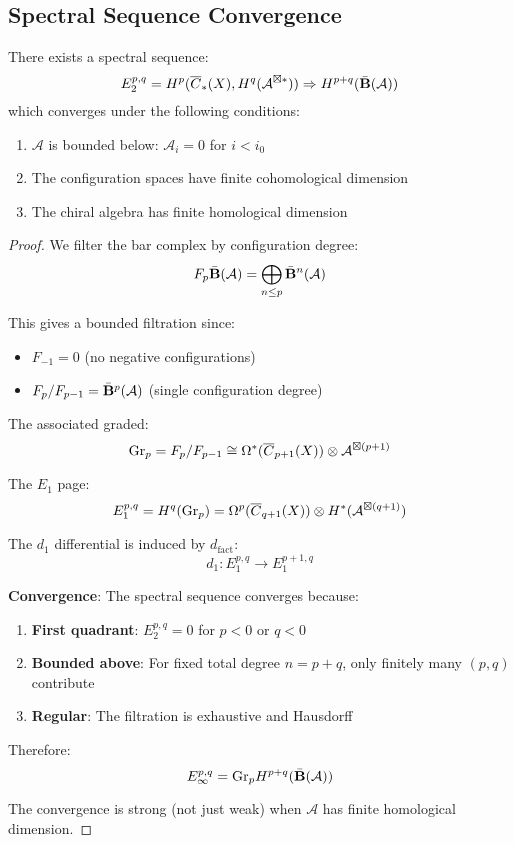 \subsection{Spectral Sequence Convergence}

\begin{theorem}
There exists a spectral sequence:
$$E_2^{p,q} = H^p(\overline{C}_{*}(X), H^q(\mathcal{A}^{\boxtimes *})) \Rightarrow H^{p+q}(\bar{\mathbf{B}}(\mathcal{A}))$$
which converges under the following conditions:
\begin{enumerate}
\item $\mathcal{A}$ is bounded below: $\mathcal{A}_i = 0$ for $i < i_0$
\item The configuration spaces have finite cohomological dimension
\item The chiral algebra has finite homological dimension
\end{enumerate}
\end{theorem}

\begin{proof}
We filter the bar complex by configuration degree:
$$F_p\bar{\mathbf{B}}(\mathcal{A}) = \bigoplus_{n \leq p} \bar{\mathbf{B}}^n(\mathcal{A})$$

This gives a bounded filtration since:
\begin{itemize}
\item $F_{-1} = 0$ (no negative configurations)
\item $F_p/F_{p-1} = \bar{\mathbf{B}}^p(\mathcal{A})$ (single configuration degree)
\end{itemize}

The associated graded:
$$\text{Gr}_p = F_p/F_{p-1} \cong \Omega^*(\overline{C}_{p+1}(X)) \otimes \mathcal{A}^{\boxtimes(p+1)}$$

The $E_1$ page:
$$E_1^{p,q} = H^q(\text{Gr}_p) = \Omega^p(\overline{C}_{q+1}(X)) \otimes H^*(\mathcal{A}^{\boxtimes(q+1)})$$

The $d_1$ differential is induced by $d_{\text{fact}}$:
$$d_1: E_1^{p,q} \to E_1^{p+1,q}$$

\textbf{Convergence}: The spectral sequence converges because:
\begin{enumerate}
\item \textbf{First quadrant}: $E_2^{p,q} = 0$ for $p < 0$ or $q < 0$
\item \textbf{Bounded above}: For fixed total degree $n = p + q$, only finitely many $(p,q)$ contribute
\item \textbf{Regular}: The filtration is exhaustive and Hausdorff
\end{enumerate}

Therefore:
$$E_\infty^{p,q} = \text{Gr}_p H^{p+q}(\bar{\mathbf{B}}(\mathcal{A}))$$

The convergence is strong (not just weak) when $\mathcal{A}$ has finite homological dimension.
\end{proof}

